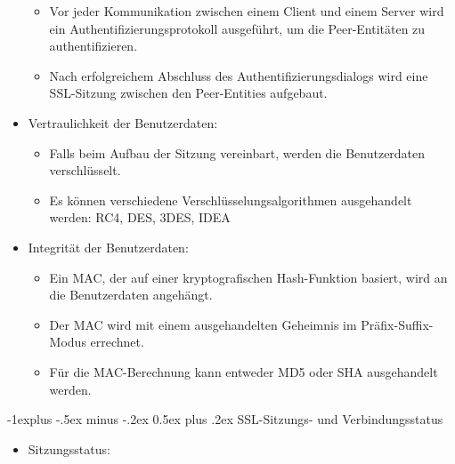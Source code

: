 \documentclass[a4paper]{article}
\makeatletter
\renewcommand{\subsection}{\@startsection{subsection}{2}{0mm}%
 {-1explus -.5ex minus -.2ex}%
 {0.5ex plus .2ex}%
 {\normalfont\normalsize\bfseries}}
\makeatother
\begin{document}
\begin{multicols}{3}
\begin{itemize}
              \begin{itemize}
                  \item
                        Vor jeder Kommunikation zwischen einem Client und einem Server wird
                        ein Authentifizierungsprotokoll ausgeführt, um die Peer-Entitäten zu
                        authentifizieren.
                  \item
                        Nach erfolgreichem Abschluss des Authentifizierungsdialogs wird eine
                        SSL-Sitzung zwischen den Peer-Entities aufgebaut.
              \end{itemize}
        \item
              Vertraulichkeit der Benutzerdaten:

              \begin{itemize}
                  \item
                        Falls beim Aufbau der Sitzung vereinbart, werden die Benutzerdaten
                        verschlüsselt.
                  \item
                        Es können verschiedene Verschlüsselungsalgorithmen ausgehandelt
                        werden: RC4, DES, 3DES, IDEA
              \end{itemize}
        \item
              Integrität der Benutzerdaten:

              \begin{itemize}
                  \item
                        Ein MAC, der auf einer kryptografischen Hash-Funktion basiert, wird
                        an die Benutzerdaten angehängt.
                  \item
                        Der MAC wird mit einem ausgehandelten Geheimnis im
                        Präfix-Suffix-Modus errechnet.
                  \item
                        Für die MAC-Berechnung kann entweder MD5 oder SHA ausgehandelt
                        werden.
              \end{itemize}
    \end{itemize}


    \subsection{SSL-Sitzungs- und
        Verbindungsstatus}

    \begin{itemize}
        \item
              Sitzungsstatus:


\end{itemize}
\end{multicols}
\end{document}
